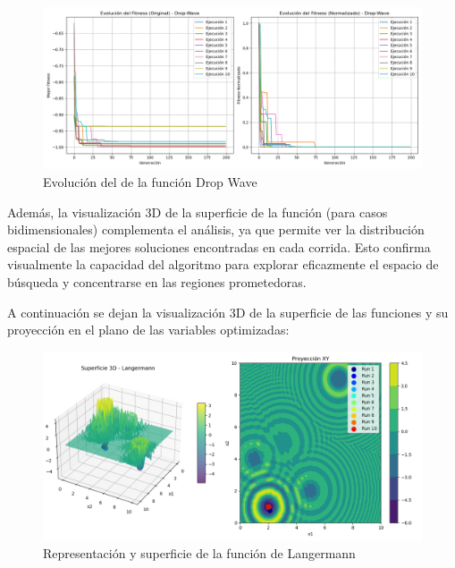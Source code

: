 \begin{figure}[H]
    \centering
    \includegraphics[width=\textwidth]{secciones/tablas/drop_wave/evolucion_fitness_drop_wave.png}
    \caption{Evolución del  de la función Drop Wave}
    \label{fig:fitness_drop_wave}
\end{figure}

Adem\'as, la visualizaci\'on 3D de la superficie de la funci\'on (para casos bidimensionales) complementa el an\'alisis, ya que permite ver la distribuci\'on espacial de las mejores soluciones encontradas en cada corrida. Esto confirma visualmente la capacidad del algoritmo para explorar eficazmente el espacio de b\'usqueda y concentrarse en las regiones prometedoras.

A continuación se dejan la visualización 3D de la superficie de las funciones y su proyección en el plano de las variables optimizadas:
\begin{figure}[H]
    \centering
    \includegraphics[width=\textwidth]{secciones/tablas/langermann/surface_3d_langermann.png}
    \caption{Representación y superficie de la función de Langermann}
    \label{fig:surface_langermann}
\end{figure}

